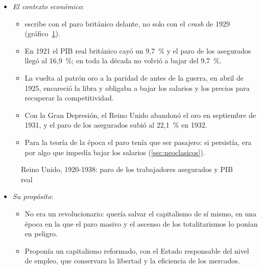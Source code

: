 \documentclass[11pt]{article}
\begin{document}
\begin{itemize}
\item \emph{El contexto económico}:
  \begin{itemize}
  \item {} escribe con el paro británico delante, no solo con el \emph{crash} de 1929 (gráfico~\ref{fig:reino-unido}).
  \item En 1921 el PIB real británico cayó un 9,7~\% y el paro de los asegurados llegó al 16,9~\%; en toda la década no volvió a bajar del 9,7~\%\nocite{BoE2017Millennium}.
  \item La vuelta al patrón oro a la paridad de antes de la guerra, en abril de 1925, encareció la libra y obligaba a bajar los salarios y los precios para recuperar la competitividad.
  \item Con la Gran Depresión, el Reino Unido abandonó el oro en septiembre de 1931, y el paro de los asegurados subió al 22,1~\% en 1932\nocite{BoE2017Millennium}.
  \item Para la teoría de la época el paro tenía que ser pasajero: si persistía, era por algo que impedía bajar los salarios (\ref{sec:neoclasicos}).
  \end{itemize}
\end{itemize}

\begin{figure}[H]
\centering
\caption{Reino Unido, 1920-1938: paro de los trabajadores asegurados y PIB real}\label{fig:reino-unido}
\end{figure}

\begin{itemize}
\item \emph{Su propósito}:
  \begin{itemize}
  \item No era un revolucionario: quería salvar el capitalismo de sí mismo, en una época en la que el paro masivo y el ascenso de los totalitarismos lo ponían en peligro.
  \item Proponía un capitalismo reformado, con el Estado responsable del nivel de empleo, que conservara la libertad y la eficiencia de los mercados\nocite{Skidelsky2003Keynes}.
  \end{itemize}
\end{itemize}
\end{document}

